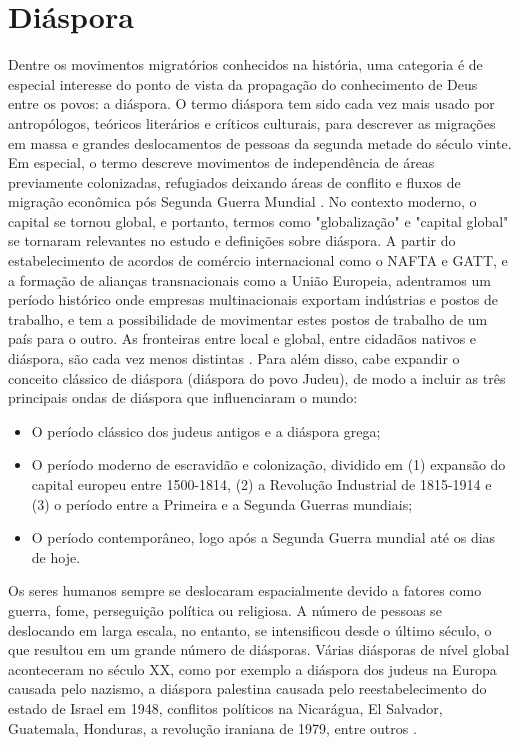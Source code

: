 \documentclass[12pt]{abntex2}
\begin{document}
\section{Diáspora}

Dentre os movimentos migratórios conhecidos na história, uma categoria é de especial interesse do ponto de vista da propagação do conhecimento de Deus entre os povos: a diáspora. O termo diáspora tem sido cada vez mais usado por antropólogos, teóricos literários e críticos culturais, para descrever as migrações em massa e grandes deslocamentos de pessoas da segunda metade do século vinte. Em especial, o termo descreve movimentos de independência de áreas previamente colonizadas, refugiados deixando áreas de conflito e fluxos de migração econômica pós Segunda Guerra Mundial \cite[p. 11]{braziel}. No contexto moderno, o capital se tornou global, e portanto, termos como "globalização" e "capital global" se tornaram relevantes no estudo e definições sobre diáspora. A partir do estabelecimento de acordos de comércio internacional como o NAFTA e GATT, e a formação de alianças transnacionais como a União Europeia, adentramos um período histórico onde empresas multinacionais exportam indústrias e postos de trabalho, e tem a possibilidade de movimentar estes postos de trabalho de um país para o outro. As fronteiras entre local e global, entre cidadãos nativos e diáspora, são cada vez menos distintas \cite[p. 19]{braziel}. Para além disso, cabe expandir o conceito clássico de diáspora (diáspora do povo Judeu), de modo a incluir as três principais ondas de diáspora que influenciaram o mundo: 

\begin{itemize}
	\item O período clássico dos judeus antigos e a diáspora grega;
	\item O período moderno de escravidão e colonização, dividido em (1) expansão do capital europeu entre 1500-1814, (2) a Revolução Industrial de 1815-1914 e (3) o período entre a Primeira e a Segunda Guerras mundiais;
	\item O período contemporâneo, logo após a Segunda Guerra mundial até os dias de hoje.
	\cite[p. 41-60]{reis}
\end{itemize}

Os seres humanos sempre se deslocaram espacialmente devido a fatores como guerra, fome, perseguição política ou religiosa. A número de pessoas se deslocando em larga escala, no entanto, se intensificou desde o último século, o que resultou em um grande número de diásporas. Várias diásporas de nível global aconteceram no século XX, como por exemplo a diáspora dos judeus na Europa causada pelo nazismo, a diáspora palestina causada pelo reestabelecimento do estado de Israel em 1948, conflitos políticos na Nicarágua, El Salvador, Guatemala, Honduras, a revolução iraniana de 1979, entre outros \cite[p. 25]{wan_diaspora_2011}.
\end{document}
